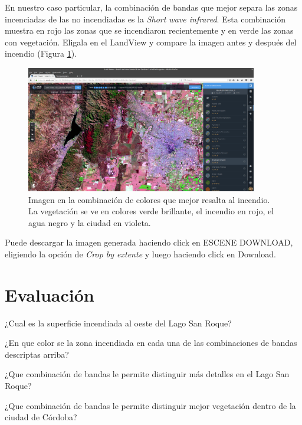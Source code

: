 \documentclass[a4paper,12pt]{book}
\begin{document}
En nuestro caso particular, la combinación de bandas que mejor separa las zonas incenciadas de las no incendiadas es la \emph{Short wave infrared}. Esta combinación muestra en rojo las zonas que se incendiaron recientemente y en verde las zonas con vegetación. Eligala en el LandView y compare la imagen antes y después del incendio (Figura \ref{fig:incendio}).

\begin{figure}[h!]
    \centering
    \includegraphics[width=0.9\textwidth]{fig:incendio.png}
    \caption{Imagen en la combinación de colores que mejor resalta al incendio. La vegetación se ve en colores verde brillante, el incendio en rojo, el agua negro y la ciudad en violeta.}
    \label{fig:incendio}
\end{figure}

Puede descargar la imagen generada haciendo click en ESCENE DOWNLOAD, eligiendo la opción de \emph{Crop by extente} y luego haciendo click en Download.

\section{Evaluación}

\begin{que}
    ¿Cual es la superficie incendiada al oeste del Lago San Roque?
\end{que}

\begin{que}
    ¿En que color se la zona incendiada en cada una de las combinaciones de bandas descriptas arriba?
\end{que}

\begin{que}
    ¿Que combinación de bandas le permite distinguir más detalles en el Lago San Roque?
\end{que}

\begin{que}
    ¿Que combinación de bandas le permite distinguir mejor vegetación dentro de la ciudad de Córdoba?
\end{que}
\end{document}
